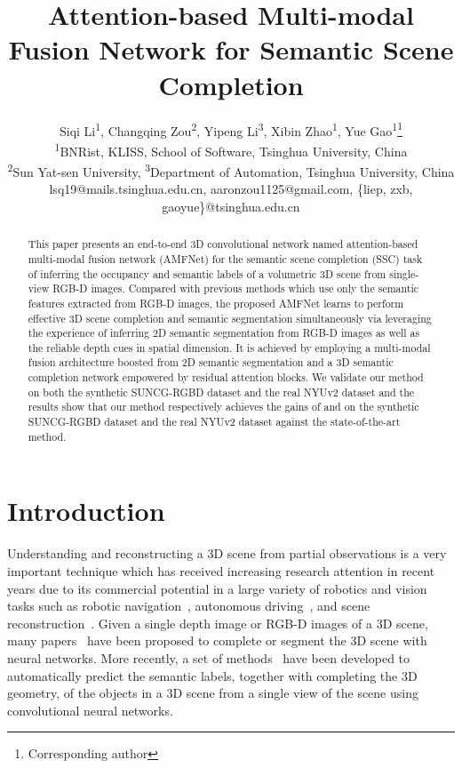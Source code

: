 \documentclass[letterpaper]{article} \usepackage{aaai20}  \usepackage{times}  \usepackage{helvet} \usepackage{courier}  \usepackage[hyphens]{url}  \usepackage{graphicx} \urlstyle{rm} \def\UrlFont{\rm}  \usepackage{graphicx}  \frenchspacing  \setlength{\pdfpagewidth}{8.5in}  \setlength{\pdfpageheight}{11in}
\title{Attention-based Multi-modal Fusion Network for Semantic Scene Completion}
\author{
Siqi Li\textsuperscript{\rm 1}, 
Changqing Zou\textsuperscript{\rm 2}, 
Yipeng Li\textsuperscript{\rm 3}, 
Xibin Zhao\textsuperscript{\rm 1}, 
Yue Gao\textsuperscript{\rm 1}\thanks{Corresponding author} 
\\ \textsuperscript{\rm 1}BNRist, KLISS, School of Software, Tsinghua University, China 
\\ \textsuperscript{\rm 2}Sun Yat-sen University, \textsuperscript{\rm 3}Department of Automation, Tsinghua University, China 
\\ lsq19@mails.tsinghua.edu.cn, aaronzou1125@gmail.com, \{liep, zxb, gaoyue\}@tsinghua.edu.cn
}
\begin{document}
\maketitle

\begin{abstract}
This paper presents an end-to-end 3D convolutional network named attention-based multi-modal fusion network (AMFNet) for the semantic scene completion (SSC) task of inferring the occupancy and semantic labels of a volumetric 3D scene from single-view RGB-D images. Compared with previous methods which use only the semantic features extracted from RGB-D images, the proposed AMFNet learns to perform effective 3D scene completion and semantic segmentation simultaneously via leveraging the experience of inferring 2D semantic segmentation from RGB-D images as well as the reliable depth cues in spatial dimension. It is achieved by employing a multi-modal fusion architecture boosted from 2D semantic segmentation and a 3D semantic completion network empowered by residual attention blocks. We validate our method on both the synthetic SUNCG-RGBD dataset and the real NYUv2 dataset and the results show that our method respectively achieves the gains of  and  on the synthetic SUNCG-RGBD dataset and the real NYUv2 dataset against the state-of-the-art method.

\end{abstract}


\section{Introduction}
Understanding and reconstructing a 3D scene from partial observations is a very important technique which has received increasing research attention in recent years due to its commercial potential in a large variety of robotics and vision tasks such as robotic navigation~\cite{Gupta2013PerceptualOA}, autonomous driving~\cite{LaugierPPYYTMN11}, and scene reconstruction~\cite{Hays2008SceneCU,han2019deep}. Given a single depth image or RGB-D images of a 3D scene, many papers~\cite{Gupta2013PerceptualOA,Ren2012RGBDSL,Firman2016StructuredPO} have been proposed to complete or segment the 3D scene with neural networks. More recently, a set of methods~\cite{Song2016SemanticSC,Liu2018SeeAT,Tong2018,Zhang2018EfficientSS,Li2019RGBDBD} have been developed to automatically predict the semantic labels, together with completing the 3D geometry, of the objects in a 3D scene from a single view of the scene using convolutional neural networks.
\end{document}
